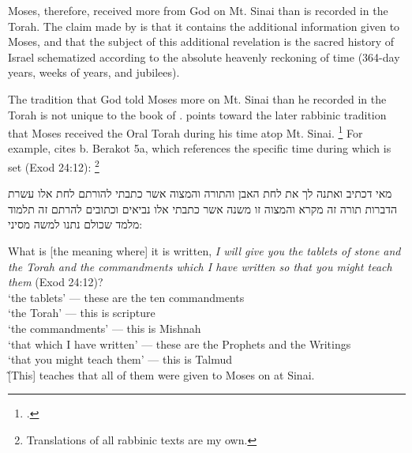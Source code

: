 Moses, therefore, received more from God on Mt. Sinai than is recorded in the Torah. The claim made by \jub is that it contains the additional information given to Moses, and that the subject of this additional revelation is the sacred history of Israel schematized according to the absolute heavenly reckoning of time (364-day years, weeks of years, and jubilees).

The tradition that God told Moses more on Mt. Sinai than he recorded in the Torah is not unique to the book of \jub. \vanderkam points toward the later rabbinic tradition that Moses received the Oral Torah during his time atop Mt. Sinai.%
    \footnote{\cite[28--31]{vanderkam_metso-etal2010}.}
For example, \vanderkam cites b. Berakot 5a, which references the specific time during which \jub is set (Exod 24:12):%
    \footnote{Translations of all rabbinic texts are my own.}

\begin{aramaictext}
    מאי דכתיב ואתנה לך את לחת האבן והתורה והמצוה אשר כתבתי להורתם לחת אלו עשרת הדברות תורה זה מקרא והמצוה זו משנה אשר כתבתי אלו נביאים וכתובים להרתם זה תלמוד מלמד שכולם נתנו למשה מסיני: 
\end{aramaictext}

\begin{translation}
    What is [the meaning where] it is written, \emph{I will give you the tablets of stone and the Torah and the commandments which I have written so that you might teach them} (Exod 24:12)?\\
    \-\hspace{2em}`the tablets' --- these are the ten commandments\\
    \-\hspace{2em}`the Torah' --- this is scripture\\
    \-\hspace{2em}`the commandments' --- this is Mishnah\\
    \-\hspace{2em}`that which I have written' --- these are the Prophets and the Writings\\
    \-\hspace{2em}`that you might teach them' --- this is Talmud\\\~
    [This] teaches that all of them were given to Moses on at Sinai.
\end{translation}

